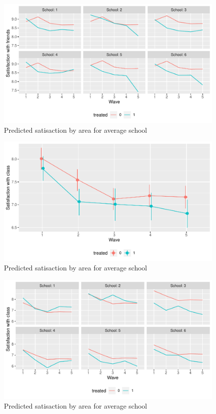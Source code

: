 \documentclass[a4, 12pt]{article}
\begin{document}
\begin{figure}[H]

{\centering \includegraphics[width=0.8\linewidth,]{../figures/sat_friends_pred_across_schools} 

}

\caption{Predicted satisaction by area for average school}\label{fig:sat-friends-pred-across-schools}
\end{figure}
\begin{figure}[H]

{\centering \includegraphics[width=0.8\linewidth,]{../figures/sat_class_pred} 

}

\caption{Predicted satisaction by area for average school}\label{fig:sat-class-pred}
\end{figure}
\begin{figure}[H]

{\centering \includegraphics[width=0.8\linewidth,]{../figures/sat_class_pred_across_schools} 

}

\caption{Predicted satisaction by area for average school}\label{fig:sat-class-pred-across-schools}
\end{figure}
\end{document}
